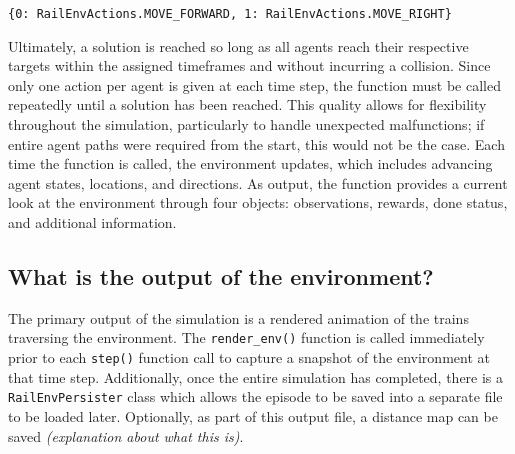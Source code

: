 \begin{verbatim}
{0: RailEnvActions.MOVE_FORWARD, 1: RailEnvActions.MOVE_RIGHT}
\end{verbatim}

\noindent Ultimately, a solution is reached so long as all agents reach their respective targets within the assigned timeframes and without incurring a collision.  Since only one action per agent is given at each time step, the function must be called repeatedly until a solution has been reached.  This quality allows for flexibility throughout the simulation, particularly to handle unexpected malfunctions; if entire agent paths were required from the start, this would not be the case.  Each time the function is called, the environment updates, which includes advancing agent states, locations, and directions. As output, the function provides a current look at the environment through four objects: observations, rewards, done status, and additional information.

\subsection{What is the output of the environment?}
The primary output of the simulation is a rendered animation of the trains traversing the environment.  The \texttt{render\_env()} function is called immediately prior to each \texttt{step()} function call to capture a snapshot of the environment at that time step.  Additionally, once the entire simulation has completed, there is a \texttt{RailEnvPersister} class which allows the episode to be saved into a separate file to be loaded later.  Optionally, as part of this output file, a distance map can be saved \textit{(explanation about what this is)}.




